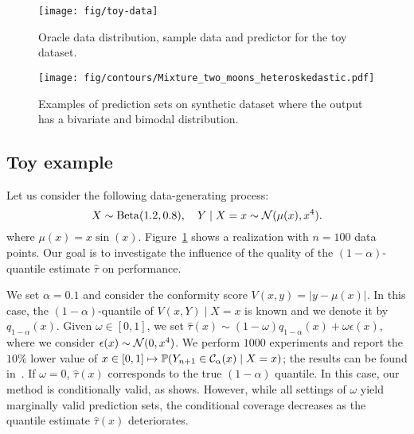 
  \begin{figure}[t!]
    \centering
    \texttt{[image: fig/toy-data]}
    \caption{Oracle data distribution, sample data and predictor for the toy dataset.}
    \label{fig:toy}
  \end{figure}

  \begin{figure*}[t!]
    \centering
    \texttt{[image: fig/contours/Mixture\_two\_moons\_heteroskedastic.pdf]}
    \caption{Examples of prediction sets on synthetic dataset where the output has a bivariate and bimodal distribution.}
    \label{fig:contours/Mixture_two_moons_heteroskedastic}
  \end{figure*}


\vspace{-10pt}
\subsection{Toy example}

\vspace{-10pt}
  Let us consider the following data-generating process:
  \begin{equation*}
    X\sim \mathrm{Beta}(1.2, 0.8), \quad Y \mid X=x\sim \mathcal{N}(\mu(x), x^4).
  \end{equation*}
  where $\mu(x) = x \sin(x) $. Figure~\ref{fig:toy} shows a realization with $n = 100$ data points. Our goal is to investigate the influence of the quality of the \((1-\alpha)\)-quantile estimate \(\widehat{\tau}\) on performance.
  
  We set $\alpha=0.1$ and consider the conformity score \(V(x,y) = |y - \mu(x)|\). In this case, the \((1-\alpha)\)-quantile of \(V(x,Y) \mid X=x\) is known and we denote it by \(q_{1-\alpha}(x)\). Given \(\omega \in [0,1]\), we set \(\widehat{\tau}(x) \sim (1-\omega) q_{1-\alpha}(x) + \omega \epsilon(x)\), where we consider \(\epsilon(x) \sim \mathcal{N}(0, x^4)\). We perform $1000$ experiments and report the $10\%$ lower value of $x \in [0,1] \mapsto \mathbb{P}(Y_{n+1}\in\mathcal{C}_{\alpha}(x) \mid X=x)$; the results can be found in~.
  If \(\omega = 0\), \(\widehat{\tau}(x)\) corresponds to the true \((1-\alpha)\) quantile. In this case, our method is conditionally valid, as  shows. However, while all settings of \(\omega\) yield marginally valid prediction sets, the conditional coverage decreases as the quantile estimate \(\widehat{\tau}(x)\) deteriorates.

